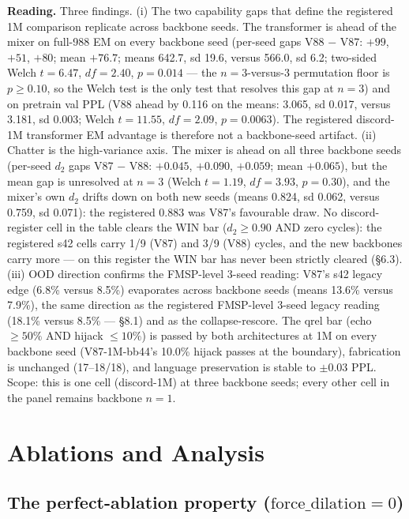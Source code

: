 \documentclass[11pt]{article}
\begin{document}
\textbf{Reading.} Three findings. (i) The two capability gaps that define the registered 1M comparison replicate across backbone seeds. The transformer is ahead of the mixer on full-988 EM on every backbone seed (per-seed gaps V88 $-$ V87: $+99$, $+51$, $+80$; mean $+76.7$; means 642.7, sd 19.6, versus 566.0, sd 6.2; two-sided Welch $t = 6.47$, $df = 2.40$, $p = 0.014$ --- the $n = 3$-versus-$3$ permutation floor is $p \geq 0.10$, so the Welch test is the only test that resolves this gap at $n = 3$) and on pretrain val PPL (V88 ahead by 0.116 on the means: 3.065, sd 0.017, versus 3.181, sd 0.003; Welch $t = 11.55$, $df = 2.09$, $p = 0.0063$). The registered discord-1M transformer EM advantage is therefore not a backbone-seed artifact. (ii) Chatter is the high-variance axis. The mixer is ahead on all three backbone seeds (per-seed $d_2$ gaps V87 $-$ V88: $+0.045$, $+0.090$, $+0.059$; mean $+0.065$), but the mean gap is unresolved at $n = 3$ (Welch $t = 1.19$, $df = 3.93$, $p = 0.30$), and the mixer's own $d_2$ drifts down on both new seeds (means 0.824, sd 0.062, versus 0.759, sd 0.071): the registered 0.883 was V87's favourable draw. No discord-register cell in the table clears the WIN bar ($d_2 \geq 0.90$ AND zero cycles): the registered s42 cells carry 1/9 (V87) and 3/9 (V88) cycles, and the new backbones carry more --- on this register the WIN bar has never been strictly cleared (\S6.3). (iii) OOD direction confirms the FMSP-level 3-seed reading: V87's s42 legacy edge (6.8\% versus 8.5\%) evaporates across backbone seeds (means 13.6\% versus 7.9\%), the same direction as the registered FMSP-level 3-seed legacy reading (18.1\% versus 8.5\% --- \S8.1) and as the collapse-rescore. The qrel bar (echo $\geq 50\%$ AND hijack $\leq 10\%$) is passed by both architectures at 1M on every backbone seed (V87-1M-bb44's 10.0\% hijack passes at the boundary), fabrication is unchanged (17--18/18), and language preservation is stable to $\pm 0.03$ PPL. Scope: this is one cell (discord-1M) at three backbone seeds; every other cell in the panel remains backbone $n = 1$.

\section{Ablations and Analysis}

\subsection{The perfect-ablation property ($\text{force\_dilation}=0$)}
\end{document}
